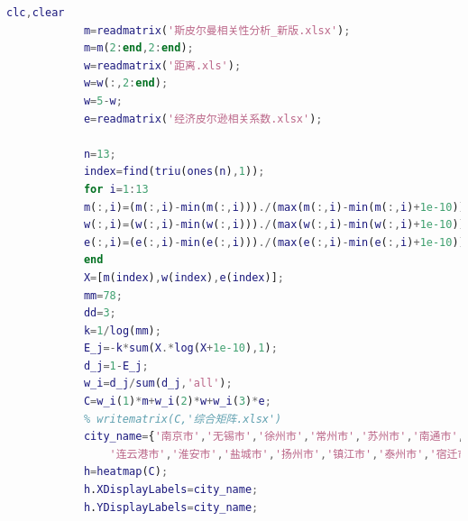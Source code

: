 \documentclass[a4paper,12pt]{article}
\begin{document}
		\begin{lstlisting}[language=Matlab, caption=问题四综合矩阵计算代码 (p4.m)]
			clc,clear
			m=readmatrix('斯皮尔曼相关性分析_新版.xlsx');
			m=m(2:end,2:end);
			w=readmatrix('距离.xls');
			w=w(:,2:end);
			w=5-w;
			e=readmatrix('经济皮尔逊相关系数.xlsx');
			
			n=13;
			index=find(triu(ones(n),1));
			for i=1:13
			m(:,i)=(m(:,i)-min(m(:,i)))./(max(m(:,i)-min(m(:,i)+1e-10)));
			w(:,i)=(w(:,i)-min(w(:,i)))./(max(w(:,i)-min(w(:,i)+1e-10)));
			e(:,i)=(e(:,i)-min(e(:,i)))./(max(e(:,i)-min(e(:,i)+1e-10)));
			end
			X=[m(index),w(index),e(index)];
			mm=78;
			dd=3;
			k=1/log(mm);
			E_j=-k*sum(X.*log(X+1e-10),1);
			d_j=1-E_j;
			w_i=d_j/sum(d_j,'all');
			C=w_i(1)*m+w_i(2)*w+w_i(3)*e;
			% writematrix(C,'综合矩阵.xlsx')
			city_name={'南京市','无锡市','徐州市','常州市','苏州市','南通市',...
				'连云港市','淮安市','盐城市','扬州市','镇江市','泰州市','宿迁市'};
			h=heatmap(C);
			h.XDisplayLabels=city_name;
			h.YDisplayLabels=city_name;
		\end{lstlisting}
		
\end{document}
